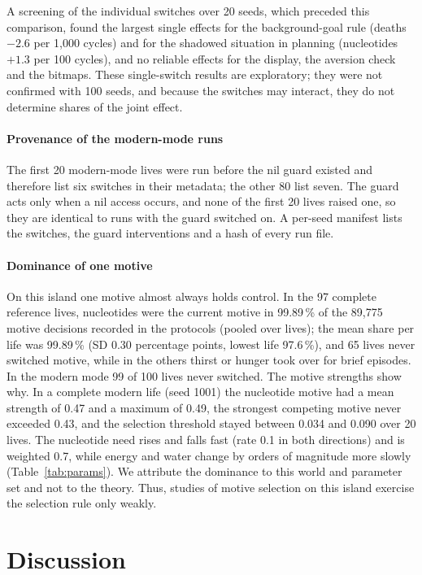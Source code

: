\documentclass[preprint,12pt,authoryear]{elsarticle}
\begin{document}
A screening of the individual switches over 20 seeds, which preceded this comparison, found the largest single effects for the background-goal rule (deaths $-2.6$ per 1{,}000 cycles) and for the shadowed situation in planning (nucleotides $+1.3$ per 100 cycles), and no reliable effects for the display, the aversion check and the bitmaps. These single-switch results are exploratory; they were not confirmed with 100 seeds, and because the switches may interact, they do not determine shares of the joint effect.

\paragraph{Provenance of the modern-mode runs} The first 20 modern-mode lives were run before the nil guard existed and therefore list six switches in their metadata; the other 80 list seven. The guard acts only when a nil access occurs, and none of the first 20 lives raised one, so they are identical to runs with the guard switched on. A per-seed manifest lists the switches, the guard interventions and a hash of every run file.

\paragraph{Dominance of one motive} On this island one motive almost always holds control. In the 97 complete reference lives, nucleotides were the current motive in 99.89\,\% of the 89{,}775 motive decisions recorded in the protocols (pooled over lives); the mean share per life was 99.89\,\% (SD 0.30 percentage points, lowest life 97.6\,\%), and 65 lives never switched motive, while in the others thirst or hunger took over for brief episodes. In the modern mode 99 of 100 lives never switched. The motive strengths show why. In a complete modern life (seed 1001) the nucleotide motive had a mean strength of 0.47 and a maximum of 0.49, the strongest competing motive never exceeded 0.43, and the selection threshold stayed between 0.034 and 0.090 over 20 lives. The nucleotide need rises and falls fast (rate 0.1 in both directions) and is weighted 0.7, while energy and water change by orders of magnitude more slowly (Table~\ref{tab:params}). We attribute the dominance to this world and parameter set and not to the theory. Thus, studies of motive selection on this island exercise the selection rule only weakly.

\section{Discussion}
\end{document}
